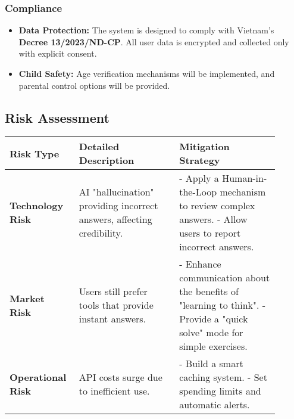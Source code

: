 \subsubsection{Compliance}
\begin{itemize}
    \item \textbf{Data Protection:} The system is designed to comply with Vietnam's \textbf{Decree 13/2023/ND-CP}. All user data is encrypted and collected only with explicit consent.
    \item \textbf{Child Safety:} Age verification mechanisms will be implemented, and parental control options will be provided.
\end{itemize}

\subsection{Risk Assessment}
\begin{table}[h]
\centering
\begin{tabular}{|p{0.2\linewidth}|p{0.35\linewidth}|p{0.35\linewidth}|}
\hline
\textbf{Risk Type} & \textbf{Detailed Description} & \textbf{Mitigation Strategy} \\
\hline
\textbf{Technology Risk} & AI "hallucination" providing incorrect answers, affecting credibility. & - Apply a Human-in-the-Loop mechanism to review complex answers. \newline - Allow users to report incorrect answers. \\
\hline
\textbf{Market Risk} & Users still prefer tools that provide instant answers. & - Enhance communication about the benefits of "learning to think". \newline - Provide a "quick solve" mode for simple exercises. \\
\hline
\textbf{Operational Risk} & API costs surge due to inefficient use. & - Build a smart caching system. \newline - Set spending limits and automatic alerts. \\
\hline
\end{tabular}
\end{table}

